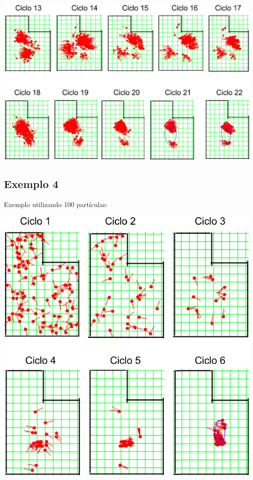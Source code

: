 {\centering
\includegraphics[scale=0.4]{figuras/cen1_ex3_2.eps}
\label{img:cen1_ex3_2}
\par}


\subsection{Exemplo 4}

Exemplo utilizando 100 partículas:

{\centering
\includegraphics[scale=0.4]{figuras/cen1_ex4.eps}
\label{img:cen1_ex4}
\par}

